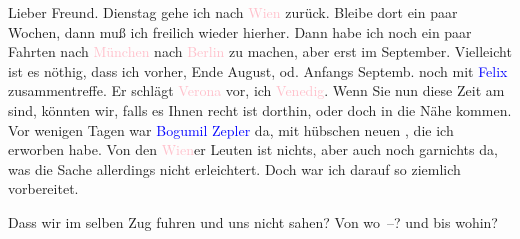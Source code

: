 \pstart
           Lieber Freund.{ }Dienstag gehe ich nach \textcolor{pink}{Wien}{}\ledrightnote{\textcolor{pink}{Wien}} zurück. Bleibe dort ein paar Wochen, dann muß ich freilich wieder
               hierher. Dann habe ich noch ein paar Fahrten nach \textcolor{pink}{München}{}\ledrightnote{\textcolor{pink}{München}}{ }{\kaufmannsund} nach \textcolor{pink}{Berlin}{}\ledrightnote{\textcolor{pink}{Berlin}} zu
               machen, aber erst im September. Vielleicht ist es nöthig,
               dass ich vorher, Ende August, od. Anfangs Septemb. noch mit \textcolor{blue}{Felix}{}\ledrightnote{\textcolor{blue}{Hugo Felix}} zusammentreffe. Er schlägt \textcolor{pink}{Verona}{}\ledrightnote{\textcolor{pink}{Verona}} vor, ich \textcolor{pink}{Venedig}{}\ledrightnote{\textcolor{pink}{Venedig}}.
               Wenn Sie nun diese Zeit am \label{K_L03316-1v}\label{K_L03316-1h} sind,
               könnten wir, falls es Ihnen recht ist dorthin, oder doch in die Nähe kommen. Vor
               wenigen Tagen war \textcolor{blue}{Bogumil Zepler}{}\ledrightnote{\textcolor{blue}{Bogumil Zepler}} da, mit
               hübschen neuen \label{K_L03316-2v}\label{K_L03316-2h}, die ich erworben habe. Von den \textcolor{pink}{Wien}{}\ledrightnote{\textcolor{pink}{Wien}}er Leuten ist nichts, aber auch noch garnichts da, was die
               Sache allerdings nicht erleichtert. Doch war ich darauf {\pb}so ziemlich vorbereitet.\pend
           
\pstart
           Dass wir im selben Zug fuhren und uns nicht sahen? Von wo –? und bis wohin?\pend
           
